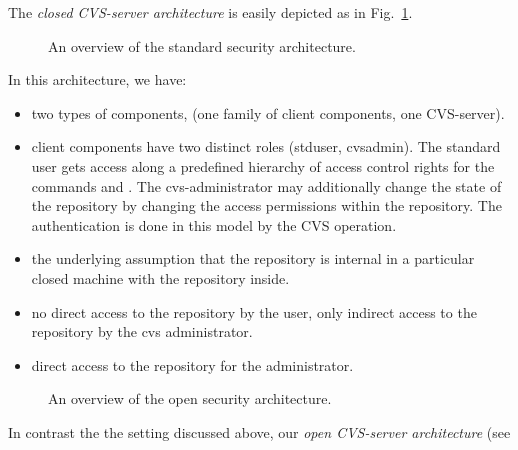 The \emph{closed CVS-server architecture}
is easily depicted as in Fig.~\ref{fig:overview1}.
  \begin{figure}
    \center
      \scalebox{0.5}{}
    \caption{An overview of the standard security architecture.\label{fig:overview1}}
  \end{figure}
In this architecture, we have:
\begin{itemize}
 \item two types of components, (one family of client components, one CVS-server).
 \item client components have two distinct roles (stduser, cvsadmin).
   The standard user gets access along a predefined hierarchy of
   access control rights for the commands  and
   .  The cvs-administrator may additionally change
   the state of the repository by changing the access permissions
   within the repository. The authentication is
   done in this model by the CVS  operation.
 \item the underlying assumption that the repository is internal 
       in a particular closed machine with the repository inside.     
 \item no direct access to the repository by the user,
       only indirect access to the repository by the cvs administrator.
 \item direct access to the repository for the administrator.
\end{itemize}
  \begin{figure}
    \center
      \caption{An overview of the open security architecture.\label{fig:overview3}}
  \end{figure}
  In contrast the the setting discussed above, our \emph{open
    CVS-server architecture} (see
